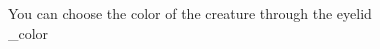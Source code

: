 \documentclass[preview]{standalone}
\begin{document}
\begin{center}
You can choose the color of the creature through the eyelid\\_color
\end{center}
\end{document}

